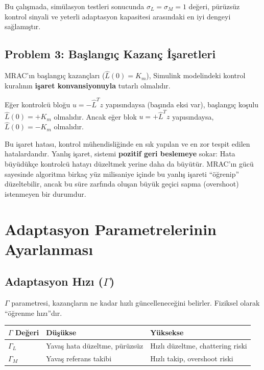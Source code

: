 \documentclass[12pt,a4paper]{article}
\begin{document}
Bu çalışmada, simülasyon testleri sonucunda $\sigma_L = \sigma_M = 1$ değeri, pürüzsüz kontrol sinyali ve yeterli adaptasyon kapasitesi arasındaki en iyi dengeyi sağlamıştır.

\subsection{Problem 3: Başlangıç Kazanç İşaretleri}
\label{subsec:sign}

MRAC'ın başlangıç kazançları ($\hat{L}(0) = K_m$), Simulink modelindeki kontrol kuralının \textbf{işaret konvansiyonuyla} tutarlı olmalıdır.

Eğer kontrolcü bloğu $u = -\hat{L}^T z$ yapısındaysa (başında eksi var), başlangıç koşulu $\hat{L}(0) = +K_m$ olmalıdır. Ancak eğer blok $u = +\hat{L}^T z$ yapısındaysa, $\hat{L}(0) = -K_m$ olmalıdır.

\begin{dikkat}
Bu işaret hatası, kontrol mühendisliğinde en sık yapılan ve en zor tespit edilen hatalardandır. Yanlış işaret, sistemi \textbf{pozitif geri beslemeye} sokar: Hata büyüdükçe kontrolcü hatayı düzeltmek yerine daha da büyütür. MRAC'ın gücü sayesinde algoritma birkaç yüz milisaniye içinde bu yanlış işareti ``öğrenip'' düzeltebilir, ancak bu süre zarfında oluşan büyük geçici sapma (overshoot) istenmeyen bir durumdur.
\end{dikkat}



\section{Adaptasyon Parametrelerinin Ayarlanması}
\label{sec:tuning}

\subsection{Adaptasyon Hızı ($\Gamma$)}

$\Gamma$ parametresi, kazançların ne kadar hızlı güncelleneceğini belirler. Fiziksel olarak ``öğrenme hızı''dır.

\begin{center}
\begin{tabular}{lp{5cm}p{5cm}}
\toprule
\textbf{$\Gamma$ Değeri} & \textbf{Düşükse} & \textbf{Yüksekse} \\
\midrule
$\Gamma_L$ & Yavaş hata düzeltme, pürüzsüz & Hızlı düzeltme, chattering riski \\
$\Gamma_M$ & Yavaş referans takibi & Hızlı takip, overshoot riski \\
\bottomrule
\end{tabular}
\end{center}
\end{document}
